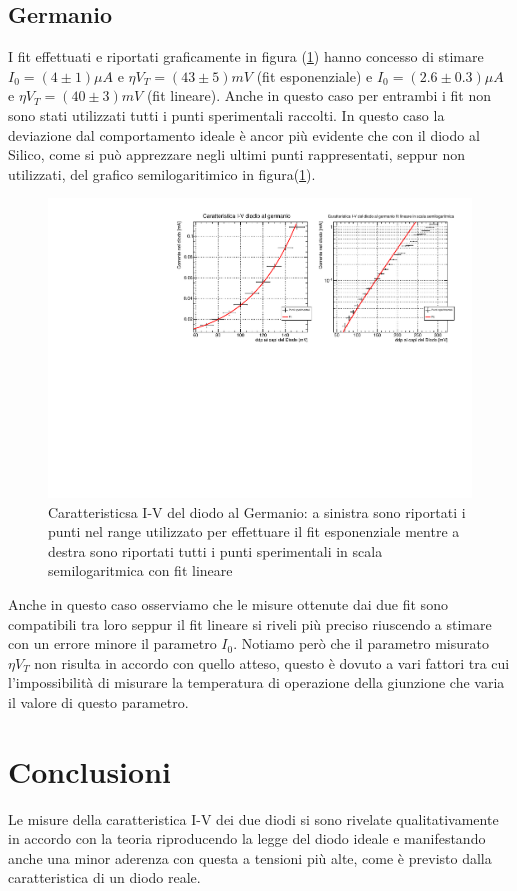 \documentclass[]{article}
\begin{document}
\subsection{Germanio}
I fit effettuati e riportati graficamente in figura (\ref{fig:germanio}) hanno concesso di stimare $I_0=(4\pm1)\mu A$ e $\eta V_T=(43\pm5)mV$ (fit esponenziale) e $I_0=(2.6\pm0.3)\mu A$ e $\eta V_T=(40\pm3)mV$ (fit lineare). Anche in questo caso per entrambi i fit non sono stati utilizzati tutti i punti sperimentali raccolti. In questo caso la deviazione dal comportamento ideale è ancor più evidente che con il diodo al Silico, come si può apprezzare negli ultimi punti rappresentati, seppur non utilizzati, del grafico semilogaritimico in figura(\ref{fig:germanio}).
\begin{figure}[H]
	\centering
	\includegraphics[width=0.9\linewidth]{../Germanio/canvas}
	\caption{Caratteristicsa I-V del diodo al Germanio: a sinistra sono riportati i punti nel range utilizzato per effettuare il fit esponenziale mentre a destra sono riportati tutti i punti sperimentali in scala semilogaritmica con fit lineare}
	\label{fig:germanio}
\end{figure}
Anche in questo caso osserviamo che le misure ottenute dai due fit sono compatibili tra loro seppur il fit lineare si riveli più preciso riuscendo a stimare con un errore minore il parametro $I_0$.
Notiamo però che il parametro misurato $\eta V_T$ non risulta in accordo con quello atteso, questo è dovuto a vari fattori tra cui l'impossibilità di misurare la temperatura di operazione della giunzione che varia il valore di questo parametro.
\section*{Conclusioni}
Le misure della caratteristica I-V dei due diodi si sono rivelate qualitativamente in accordo con la teoria riproducendo la legge del diodo ideale e manifestando anche una minor aderenza con questa a tensioni più alte, come è previsto dalla caratteristica di un diodo reale. 
\end{document}
